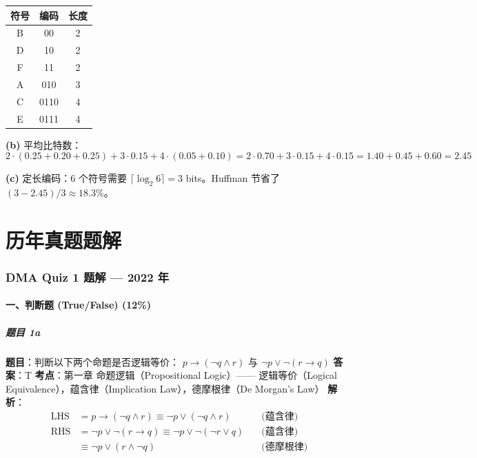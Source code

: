 \documentclass[10pt,a4paper,openany]{ctexbook}
\theoremstyle{definition}
\theoremstyle{remark}
\begin{document}
\begin{center}
\begin{tabular}{ccc}
\hline
符号 & 编码 & 长度 \\ \hline
B & 00 & 2 \\
D & 10 & 2 \\
F & 11 & 2 \\
A & 010 & 3 \\
C & 0110 & 4 \\
E & 0111 & 4 \\
\hline
\end{tabular}

\end{center}

\textbf{(b)} 平均比特数：
\[
2 \cdot (0.25+0.20+0.25) + 3 \cdot 0.15 + 4 \cdot (0.05+0.10) = 2 \cdot 0.70 + 3 \cdot 0.15 + 4 \cdot 0.15 = 1.40 + 0.45 + 0.60 = 2.45
\]

\textbf{(c)} 定长编码：6 个符号需要 $\lceil \log_2 6 \rceil = 3$ bits。Huffman 节省了 $(3 - 2.45)/3 \approx 18.3\%$。

\part{历年真题题解}

\section{DMA Quiz 1 题解 — 2022 年}

\subsection{一、判断题 (True/False) (12\%)}

\subsubsection{题目 1a}

\textbf{题目}：判断以下两个命题是否逻辑等价：
$p \to (\neg q \land r)$ 与 $\neg p \lor \neg(r \to q)$
\textbf{答案}：T
\textbf{考点}：第一章 命题逻辑（Propositional Logic）—— 逻辑等价（Logical Equivalence），蕴含律（Implication Law），德摩根律（De Morgan's Law）
\textbf{解析}：
\[
\begin{aligned}
\text{LHS} &= p \to (\neg q \land r) \equiv \neg p \lor (\neg q \land r) \quad &\text{(蕴含律)}\\[4pt]
\text{RHS} &= \neg p \lor \neg(r \to q) \equiv \neg p \lor \neg(\neg r \lor q) \quad &\text{(蕴含律)}\\
&\equiv \neg p \lor (r \land \neg q) \quad &\text{(德摩根律)}
\end{aligned}
\]
\end{document}
